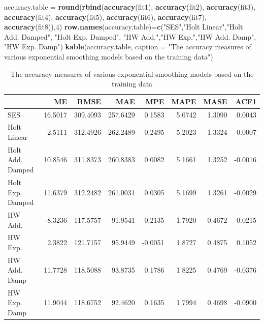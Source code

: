 \documentclass[
]{book}
\newenvironment{Shaded}{\begin{snugshade}}{\end{snugshade}}
\newcommand{\AttributeTok}[1]{\textcolor[rgb]{0.13,0.29,0.53}{#1}}
\newcommand{\DecValTok}[1]{\textcolor[rgb]{0.00,0.00,0.81}{#1}}
\newcommand{\FunctionTok}[1]{\textcolor[rgb]{0.13,0.29,0.53}{\textbf{#1}}}
\newcommand{\NormalTok}[1]{#1}
\newcommand{\OtherTok}[1]{\textcolor[rgb]{0.56,0.35,0.01}{#1}}
\newcommand{\StringTok}[1]{\textcolor[rgb]{0.31,0.60,0.02}{#1}}
\begin{document}
\begin{Shaded}
\begin{Highlighting}[]
\NormalTok{accuracy.table }\OtherTok{=} \FunctionTok{round}\NormalTok{(}\FunctionTok{rbind}\NormalTok{(}\FunctionTok{accuracy}\NormalTok{(fit1), }\FunctionTok{accuracy}\NormalTok{(fit2), }\FunctionTok{accuracy}\NormalTok{(fit3), }\FunctionTok{accuracy}\NormalTok{(fit4),}
                             \FunctionTok{accuracy}\NormalTok{(fit5), }\FunctionTok{accuracy}\NormalTok{(fit6), }\FunctionTok{accuracy}\NormalTok{(fit7), }\FunctionTok{accuracy}\NormalTok{(fit8)),}\DecValTok{4}\NormalTok{)}
\FunctionTok{row.names}\NormalTok{(accuracy.table)}\OtherTok{=}\FunctionTok{c}\NormalTok{(}\StringTok{"SES"}\NormalTok{,}\StringTok{"Holt Linear"}\NormalTok{,}\StringTok{"Holt Add. Damped"}\NormalTok{, }\StringTok{"Holt Exp. Damped"}\NormalTok{,}
                            \StringTok{"HW Add."}\NormalTok{,}\StringTok{"HW Exp."}\NormalTok{,}\StringTok{"HW Add. Damp"}\NormalTok{, }\StringTok{"HW Exp. Damp"}\NormalTok{)}
\FunctionTok{kable}\NormalTok{(accuracy.table, }\AttributeTok{caption =} \StringTok{"The accuracy measures of various exponential smoothing models }
\StringTok{      based on the training data"}\NormalTok{)}
\end{Highlighting}
\end{Shaded}

\begin{table}

\caption{\label{tab:unnamed-chunk-236}The accuracy measures of various exponential smoothing models 
      based on the training data}
\centering
\begin{tabular}[t]{l|r|r|r|r|r|r|r}
\hline
  & ME & RMSE & MAE & MPE & MAPE & MASE & ACF1\\
\hline
SES & 16.5017 & 309.4093 & 257.6429 & 0.1583 & 5.0742 & 1.3090 & 0.0043\\
\hline
Holt Linear & -2.5111 & 312.4926 & 262.2489 & -0.2495 & 5.2023 & 1.3324 & -0.0007\\
\hline
Holt Add. Damped & 10.8546 & 311.8373 & 260.8383 & 0.0082 & 5.1661 & 1.3252 & -0.0016\\
\hline
Holt Exp. Damped & 11.6379 & 312.2482 & 261.0031 & 0.0305 & 5.1699 & 1.3261 & -0.0029\\
\hline
HW Add. & -8.3236 & 117.5757 & 91.9541 & -0.2135 & 1.7920 & 0.4672 & -0.0215\\
\hline
HW Exp. & 2.3822 & 121.7157 & 95.9449 & -0.0051 & 1.8727 & 0.4875 & 0.1052\\
\hline
HW Add. Damp & 11.7728 & 118.5088 & 93.8735 & 0.1786 & 1.8225 & 0.4769 & -0.0376\\
\hline
HW Exp. Damp & 11.9044 & 118.6752 & 92.4620 & 0.1635 & 1.7994 & 0.4698 & -0.0900\\
\hline
\end{tabular}
\end{table}
\end{document}
